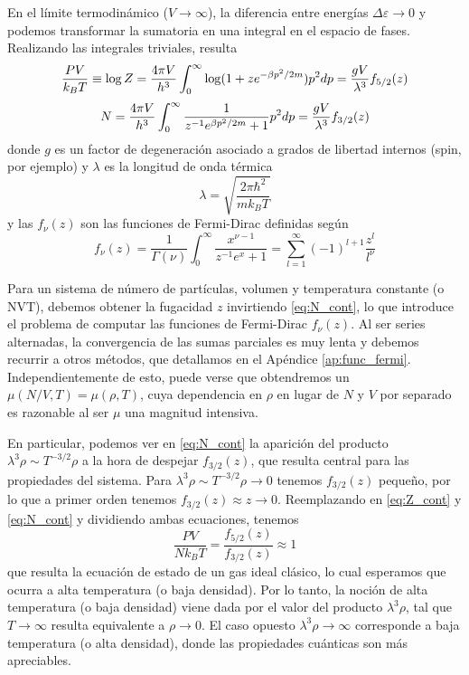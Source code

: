 En el límite termodinámico ($V\to\infty$), la diferencia entre energías $\Delta\varepsilon\to 0$ y podemos transformar la sumatoria en una integral en el espacio de fases.
Realizando las integrales triviales, resulta
\begin{equation}{\label{eq:Z_cont}}
 \frac{PV}{k_BT} \equiv \log Z = \frac{4\pi V}{h^3} \int_0^\infty \log(1+ze^{-\beta p^2/2m})p^2dp = \frac{gV}{\lambda^3}f_{5/2}(z)
\end{equation}
\begin{equation}{\label{eq:N_cont}}
 N = \frac{4\pi V}{h^3} \int_0^\infty \frac{1}{z^{-1}e^{\beta p^2/2m}+1} p^2dp = \frac{gV}{\lambda^3}f_{3/2}(z)
\end{equation}
donde $g$ es un factor de degeneración asociado a grados de libertad internos (spin, por ejemplo) y  $\lambda$ es la longitud de onda térmica
\[ \lambda = \sqrt{ \frac{2\pi\hbar^2}{mk_BT} } \]
y las $f_\nu(z)$ son las funciones de Fermi-Dirac definidas según
\[ f_\nu(z) = \frac{1}{\Gamma(\nu)}\int_0^\infty \frac{x^{\nu-1}}{z^{-1}e^x+1} = \sum_{l=1}^\infty (-1)^{l+1}\frac{z^l}{l^\nu}\]

Para un sistema de número de partículas, volumen y temperatura constante (o NVT), debemos obtener la fugacidad $z$ invirtiendo \eqref{eq:N_cont}, lo que introduce el problema de computar las funciones de Fermi-Dirac $f_\nu(z)$.
Al ser series alternadas, la convergencia de las sumas parciales es muy lenta y debemos recurrir a otros métodos, que detallamos en el Apéndice \ref{ap:func_fermi}.
Independientemente de esto, puede verse que obtendremos un $\mu(N/V,T) = \mu(\rho, T)$, cuya dependencia en $\rho$ en lugar de $N$ y $V$ por separado es razonable al ser $\mu$ una magnitud intensiva.

En particular, podemos ver en \eqref{eq:N_cont} la aparición del producto $\lambda^3\rho \sim T^{-3/2}\rho$ a la hora de despejar $f_{3/2}(z)$, que resulta central para las propiedades del sistema.
Para $\lambda^3\rho \sim T^{-3/2}\rho\to0$ tenemos $f_{3/2}(z)$ pequeño, por lo que a primer orden tenemos $f_{3/2}(z)\approx z\to 0$.
Reemplazando en \eqref{eq:Z_cont} y \eqref{eq:N_cont} y dividiendo ambas ecuaciones, tenemos 
\[ \frac{PV}{Nk_BT} = \frac{f_{5/2}(z)}{f_{3/2}(z)} \approx 1 \]
que resulta la ecuación de estado de un gas ideal clásico, lo cual esperamos que ocurra a alta temperatura (o baja densidad).
Por lo tanto, la noción de alta temperatura (o baja densidad) viene dada por el valor del producto $\lambda^3\rho$, tal que $T\to\infty$ resulta equivalente a $\rho\to0$.
El caso opuesto $\lambda^3\rho\to\infty$ corresponde a baja temperatura (o alta densidad), donde las propiedades cuánticas son más apreciables.

